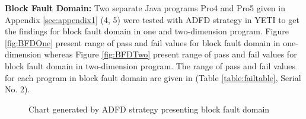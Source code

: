 


\noindent \textbf{Block Fault Domain:}  Two separate Java programs Pro4 and Pro5 given in Appendix \ref{sec:appendix1} (4, 5) were tested with ADFD strategy in YETI to get the findings for block fault domain in one and two-dimension program. Figure \ref{fig:BFDOne} present range of pass and fail values for block fault domain in one-dimension whereas Figure \ref{fig:BFDTwo} present range of pass and fail values for block fault domain in two-dimension program. The range of pass and fail values for each program in block fault domain are given in (Table \ref{table:failtable}, Serial No. 2).





\begin{figure} [H]
\centering
{}

\caption{Chart generated by ADFD strategy presenting block fault domain}
\end{figure}


